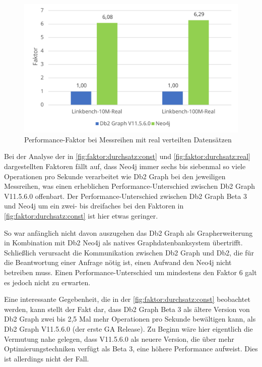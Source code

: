 \begin{figure}[!ht]
    \centering
    \includegraphics[width=\textwidth]{images/diagramme/faktor_durchschittlicher_durchsatz_real.pdf}
    \caption{Performance-Faktor bei Messreihen mit real verteilten Datensätzen}
    \label{fig:faktor:durchsatz:real}
\end{figure}

Bei der Analyse der in \autoref{fig:faktor:durchsatz:const} und \autoref{fig:faktor:durchsatz:real} dargestellten Faktoren fällt auf, dass Neo4j immer sechs bis siebenmal so viele Operationen pro Sekunde verarbeitet wie Db2 Graph bei den jeweiligen Messreihen, was einen erheblichen Performance-Unterschied zwischen Db2 Graph V11.5.6.0 offenbart. Der Performance-Unterschied zwischen Db2 Graph Beta 3 und Neo4j um ein zwei- bis dreifaches bei den Faktoren in \autoref{fig:faktor:durchsatz:const} ist hier etwas geringer.

So war anfänglich nicht davon auszugehen das Db2 Graph als Grapherweiterung in Kombination mit Db2 Neo4j als natives Graphdatenbanksystem übertrifft. Schließlich verursacht die Kommunikation zwischen Db2 Graph und Db2, die für die Beantwortung einer Anfrage nötig ist, einen Aufwand den Neo4j nicht betreiben muss. Einen Performance-Unterschied um mindestens den Faktor 6 galt es jedoch nicht zu erwarten. 

Eine interessante Gegebenheit, die in der \autoref{fig:faktor:durchsatz:const} beobachtet werden, kann stellt der Fakt dar, dass Db2 Graph Beta 3 als ältere Version von Db2 Graph zwei bis 2,5 Mal mehr Operationen pro Sekunde bewältigen kann, als Db2 Graph V11.5.6.0 (der erste GA Release). Zu Beginn wäre hier eigentlich die Vermutung nahe gelegen, dass V11.5.6.0 als neuere Version, die über mehr Optimierungstechniken verfügt als Beta 3, eine höhere Performance aufweist. Dies ist allerdings nicht der Fall. 

